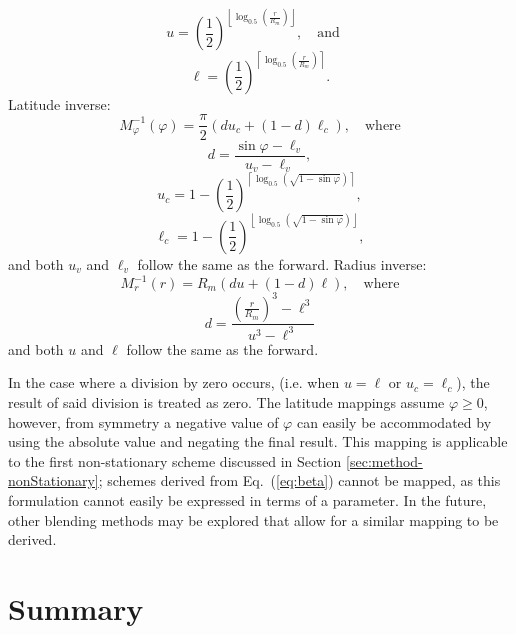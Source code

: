 %
\begin{equation*}
u = \left( \frac{1}{2} \right)^{ \left\lfloor \log_{0.5} \left( \frac{r}{R_{m}} \right) \right\rfloor }, \quad \text{and} \quad
\end{equation*}
%
\begin{equation*}
\ell = \left( \frac{1}{2} \right)^{ \left\lceil \log_{0.5} \left( \frac{r}{R_{m}} \right) \right\rceil }.
\end{equation*}
%
%
Latitude inverse:
%
\begin{equation*}
M^{-1}_{\varphi}(\varphi) = \frac{\pi}{2} \left( d u_{c} + \left( 1 - d \right) \ell_{c} \right), \quad \text{where}
\end{equation*}
%
\begin{equation*}
d = \frac{\sin \varphi - \ell_{v}}{u_{v} - \ell_{v}},
\end{equation*}
%
\begin{equation*}
u_{c} = 1 - \left( \frac{1}{2} \right)^{ \left\lceil \log_{0.5} \left( \sqrt{1 - \sin \varphi} \right) \right\rceil },
\end{equation*}
%
\begin{equation*}
\ell_{c} = 1 - \left( \frac{1}{2} \right)^{ \left\lfloor \log_{0.5} \left( \sqrt{1 - \sin \varphi} \right) \right\rfloor },
\end{equation*}
%
%
and both $u_{v}$ and $\ell_{v}$ follow the same as the forward.
Radius inverse:
%
\begin{equation*}
M^{-1}_{r}(r) = R_m \left( d u + \left( 1 - d \right) \ell \right), \quad \text{where}
\end{equation*}
%
\begin{equation*}
d = \frac{ \left( \frac{r}{R_{m}} \right)^{3} - \ell^{3}}{u^{3} - \ell^{3}}
\end{equation*}
%
and both $u$ and $\ell$ follow the same as the forward.


In the case where a division by zero occurs, (i.e. when $u = \ell$ or $u_{c} = \ell_{c}$), the result of said division is treated as zero.
The latitude mappings assume $\varphi \ge 0$, however, from symmetry a negative value of $\varphi$ can easily be accommodated by using the absolute value and negating the final result.
This mapping is applicable to the first non-stationary scheme discussed in Section \ref{sec:method-nonStationary}; schemes derived from Eq.~(\ref{eq:beta}) cannot be mapped, as this formulation cannot easily be expressed in terms of a parameter.
In the future, other blending methods may be explored that allow for a similar mapping to be derived.




\section{Summary}